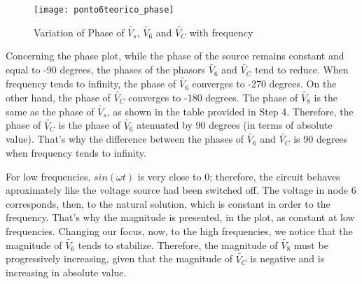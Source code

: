 \FloatBarrier
\begin{figure}[h] \centering
	\texttt{[image: ponto6teorico\_phase]}
	\caption{Variation of Phase of $\tilde{V_s}$, $\tilde{V_6}$ and $\tilde{V_C}$ with frequency}
	\label{fig:phase}
\end{figure} 
\FloatBarrier

Concerning the phase plot, while the phase of the source remains constant and equal to -90 degrees, the phases of the phasors $\tilde{V_6}$ and $\tilde{V_C}$ tend to reduce. When frequency tends to infinity, the phase of $\tilde{V_6}$ converges to -270 degrees. On the other hand, the phase of $\tilde{V_C}$ converges to -180 degrees. The phase of $\tilde{V_8}$ is the same as the phase of $\tilde{V_s}$, as shown in the table provided in Step 4. Therefore, the phase of $\tilde{V_C}$ is the phase of $\tilde{V_6}$ atenuated by 90 degrees (in terms of absolute value). That's why the difference between the phases of $\tilde{V_6}$ and $\tilde{V_C}$ is 90 degrees when frequency tends to infinity.

For low frequencies, $sin(\omega t)$ is very close to 0; therefore, the circuit behaves aproximately like the voltage source had been switched off. The voltage in node 6 corresponds, then, to the natural solution, which is constant in order to the frequency. That's why the magnitude is presented, in the plot, as constant at low frequencies. Changing our focus, now, to the high frequencies, we notice that the magnitude of $\tilde{V_6}$ tends to stabilize. Therefore, the magnitude of $\tilde{V_8}$ must be progressively increasing, given that the magnitude of $\tilde{V_C}$ is negative and is increasing in absolute value.
